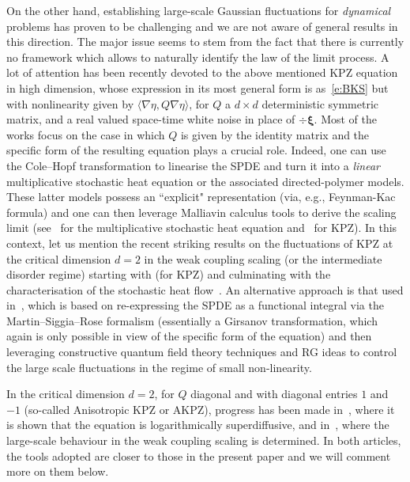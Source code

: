 \documentclass[reqno,11pt]{preprint}
\newcommand{\1}{\mathds{1}}
\begin{document}
On the other hand, establishing large-scale Gaussian fluctuations 
for {\it dynamical} problems has proven to be challenging  
and we are not aware of general results in this direction.
The major issue seems to stem from the fact that there is currently no framework 
which allows to naturally identify the law of the limit process. 
A lot of attention has been recently devoted to the above mentioned KPZ equation in high dimension, 
whose expression in its most general form is as~\eqref{e:BKS} but 
with nonlinearity given by $\langle \nabla\eta, Q\nabla\eta\rangle$, for $Q$ 
a $d\times d$ deterministic symmetric matrix, 
and a real valued space-time white noise in place of $\div\boldsymbol{\xi}$. 
Most of the works focus on the case in which $Q$ is given by the identity matrix  
and the specific form of the resulting equation plays a crucial role. Indeed, one can use the Cole--Hopf 
transformation to linearise the SPDE and turn it into a {\it linear} multiplicative 
stochastic heat equation or the associated directed-polymer models. 
These latter models possess an ``explicit" representation (via, e.g., Feynman-Kac formula) 
and one can then leverage Malliavin calculus tools to derive the scaling limit 
(see~\cite{dunlapRandomHeatEquation2021, guEdwardsWilkinsonLimit2018} for 
the multiplicative stochastic heat equation and~\cite{Gu2018b, CCM1, LZ, CNN} for KPZ). 
In this context, let us  mention the recent striking results on the fluctuations of KPZ at the critical dimension $d=2$ 
in the weak coupling scaling (or the intermediate disorder regime) starting with \cite{CD,CSZ,Gu2020} (for KPZ)
and culminating with the characterisation of the stochastic heat flow~\cite{caravennaCritical2dStochastic2023}.
An alternative approach is that used in~\cite{magnenScalingLimitKPZ2018}, 
which is based on re-expressing the SPDE as a functional integral via the Martin--Siggia--Rose formalism 
(essentially a Girsanov transformation, which again is only possible in view of the specific form of the equation) 
and then leveraging constructive quantum field theory techniques and RG ideas to control 
the large scale fluctuations in the regime of small non-linearity. 

In the critical dimension $d=2$, for $Q$ diagonal and with diagonal entries $1$ and $-1$ (so-called 
Anisotropic KPZ or AKPZ), progress has been made in~\cite{CET}, 
where it is shown that the equation is logarithmically superdiffusive, and in~\cite{CETWeak}, 
where the large-scale behaviour in the weak coupling scaling is determined. In both articles, 
the tools adopted are closer to those in the present paper and we will comment more on them below. 
\end{document}
